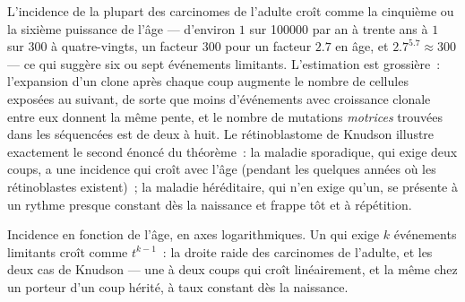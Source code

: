 \begin{example}\label{ex:b3:cancer-biology:exponent}
L'incidence de la plupart des carcinomes de l'adulte croît comme la
cinquième ou la sixième puissance de l'âge --- d'environ $1$ sur
\num{100000} par an à trente ans à $1$ sur $300$ à quatre-vingts, un
facteur $300$ pour un facteur $2.7$ en âge, et
$2.7^{5.7} \approx 300$ --- ce qui suggère six ou sept événements
limitants. L'estimation est grossière~: l'expansion d'un clone après
chaque coup augmente le nombre de cellules exposées au suivant, de
sorte que moins d'événements avec croissance clonale entre eux donnent
la même pente, et le nombre de mutations \emph{motrices} trouvées dans
les  séquencées est de deux à huit. Le rétinoblastome de Knudson
illustre exactement le second énoncé du théorème~: la maladie
sporadique, qui exige deux coups, a une incidence qui croît avec l'âge
(pendant les quelques années où les rétinoblastes existent)~; la
maladie héréditaire, qui n'en exige qu'un, se présente à un rythme
presque constant dès la naissance et frappe tôt et à répétition.
\end{example}

\begin{omfigure}

{\small Incidence en fonction de l'âge, en axes logarithmiques. Un
 qui exige $k$ événements limitants croît comme $t^{k-1}$~: la
droite raide des carcinomes de l'adulte, et les deux cas de Knudson ---
une  à deux coups qui croît linéairement, et la même  chez
un porteur d'un coup hérité, à taux constant dès la naissance.}
\end{omfigure}

